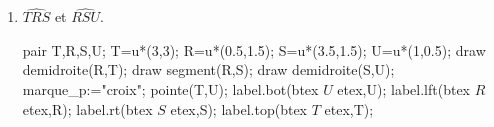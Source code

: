 \begin{exercice*}
\begin{multicols}{2}
\begin{enumerate}
\begin{Geometrie}[CoinHD={(4u,3.5u)}]
            \end{Geometrie}
            \item $\widehat{TRS}$ et $\widehat{RSU}$.\par
            \hspace*{-5mm}
            \begin{Geometrie}[CoinHD={(4u,3.5u)}]
                pair T,R,S,U;
                T=u*(3,3);
                R=u*(0.5,1.5);
                S=u*(3.5,1.5);
                U=u*(1,0.5);
                draw demidroite(R,T);
                draw segment(R,S);
                draw demidroite(S,U);
                marque_p:="croix";
                pointe(T,U);
                label.bot(btex $U$ etex,U);
                label.lft(btex $R$ etex,R);            
                label.rt(btex $S$ etex,S);
                label.top(btex $T$ etex,T);
            \end{Geometrie}
        \end{enumerate}
    \end{multicols}
\end{exercice*}

